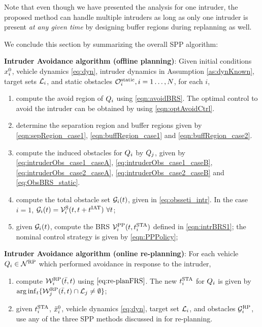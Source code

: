 \begin{remark}
Note that even though we have presented the analysis for one intruder, the proposed method can handle multiple intruders as long as only one intruder is present \textit{at any given time} by designing buffer regions during replanning as well.
\end{remark}

We conclude this section by summarizing the overall SPP algorithm: 
\begin{alg}
\label{alg:intruder}
\textbf{Intruder Avoidance algorithm (offline planning)}: Given initial conditions $x_i^0$, vehicle dynamics \eqref{eq:dyn}, intruder dynamics in Assumption \ref{as:dynKnown}, target sets $\mathcal{L}_i$, and static obstacles $\mathcal{O}^\text{static}_i, i = 1\ldots, N$, for each $i$,
\begin{enumerate}
\item compute the avoid region of $Q_i$ using \eqref{eqn:avoidBRS}. The optimal control to avoid the intruder can be obtained by using \eqref{eqn:optAvoidCtrl}.
\item determine the separation region and buffer regions given by \eqref{eqn:sepRegion_case1}, \eqref{eqn:buffRegion_case1} and \eqref{eqn:buffRegion_case2}.
\item compute the induced obstacles for $Q_i$ by $Q_j$, given by \eqref{eq:intruderObs_case1_caseA}, \eqref{eq:intruderObs_case1_caseB}, \eqref{eq:intruderObs_case2_caseA}, \eqref{eq:intruderObs_case2_caseB} and \eqref{eq:ObsBRS_static}. 
\item compute the total obstacle set $\mathcal{G}_i(t)$, given in \eqref{eq:obsseti_intr}. In the case $i=1$, $\mathcal{G}_i(t) = \mathcal{V}^{\text{S}}_{i}(t, t+t^\text{IAT}) ~ \forall t$;
\item given $\mathcal{G}_i(t)$, compute the BRS $\mathcal{V}^{\text{PP}}_{i}(t, t^\text{STA}_i)$ defined in \eqref{eqn:intrBRS1}; the nominal control strategy is given by \eqref{eqn:PPPolicy};
\end{enumerate}

\textbf{Intruder Avoidance algorithm (online re-planning)}: For each vehicle $Q_i \in \mathcal{N}^\text{RP}$ which performed avoidance in response to the intruder,
\begin{enumerate}
\item compute $\mathcal{W}_i^{\text{RP}}(\bar{t}, t)$ using $\eqref{eq:re-planFRS}$. The new $t^\text{STA}_i$ for $Q_i$ is given by $\arg \inf_t \{ \mathcal{W}_j^{\text{RP}}(\bar{t}, t) \cap \mathcal{L}_j \neq \emptyset \}$;
\item given $t^\text{STA}_i$, $\tilde{x}_i^0$, vehicle dynamics \eqref{eq:dyn}, target set $\mathcal{L}_i$, and obstacles $\mathcal{G}_i^{\text{RP}}$, use any of the three SPP methods discussed in \cite{chen2016robust} for re-planning. 
\end{enumerate}
\end{alg}